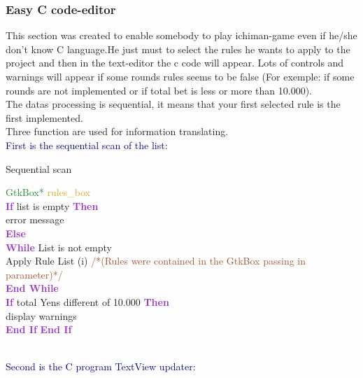 \documentclass[11pt]{sample}
\renewcommand{\algorithmicwhile}   {\textcolor{DarkOrchid}{\textbf{While}}}
\renewcommand{\algorithmicendwhile}{\textcolor{DarkOrchid}{\textbf{End While}}}
\renewcommand{\algorithmicif}      {\textbf{\textcolor{DarkOrchid}{If}}}
\renewcommand{\algorithmicendif}   {\textcolor{DarkOrchid}{\textbf{End If}}}
\renewcommand{\algorithmicelse}    {\textcolor{DarkOrchid}{\textbf{Else}}}
\renewcommand{\algorithmicthen}    {\textcolor{DarkOrchid}{\textbf{Then}}}
\begin{document}
\subsubsection{Easy C code-editor }
This section was created to enable somebody to play ichiman-game even if he/she don't know C language.He just must to select the rules he wants to apply to the project and then in the text-editor the c code will appear. Lots of controls and warnings will appear if some rounds rules seems to be false (For exemple: if some rounds are not implemented or if total bet is less or more than 10.000).\\
The datas processing is sequential, it means that your first selected rule is the first implemented. \\Three function are used for information translating.\\
\textcolor{Navy}{First is the sequential scan of the list:}\\
\begin{algorithm}
  \caption{Sequential scan}
  \begin{algorithmic}
    \REQUIRE \textcolor{ForestGreen}{GtkBox*} \textcolor{Goldenrod}{rules\_box}\\
    \algorithmicif{ list is empty }\algorithmicthen\\
    \hspace{4mm}error message\\
    \algorithmicelse\\
    \hspace{4mm}\algorithmicwhile{ List is not empty }\\
    \hspace{8mm}Apply Rule List (i) \textcolor{Sienna}{ /*(Rules were contained in the GtkBox passing in parameter)*/}\\
    \hspace{4mm}\algorithmicendwhile\\
    \hspace{4mm}\algorithmicif{ total Yens different of 10.000 }\algorithmicthen\\
    \hspace{8mm}display warnings\\
    \hspace{4mm}\algorithmicendif
    \algorithmicendif
  \end{algorithmic}
\end{algorithm}\\
\textcolor{Navy}{Second is the C program TextView updater:}\\
\end{document}
